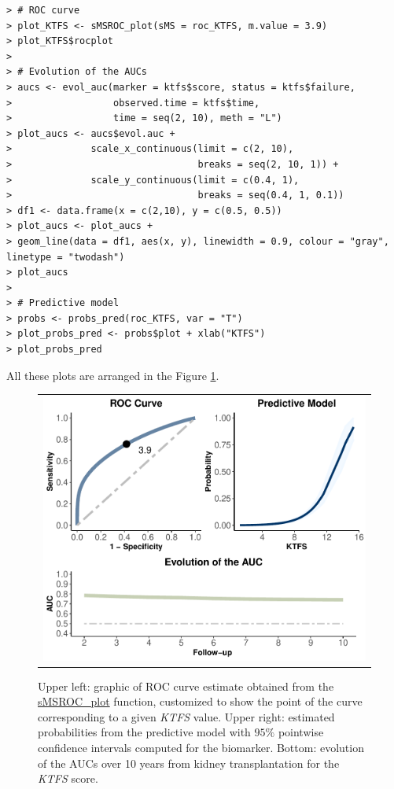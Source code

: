 \begin{verbatim}
> # ROC curve
> plot_KTFS <- sMSROC_plot(sMS = roc_KTFS, m.value = 3.9)
> plot_KTFS$rocplot
>
> # Evolution of the AUCs
> aucs <- evol_auc(marker = ktfs$score, status = ktfs$failure,
>                  observed.time = ktfs$time,
>                  time = seq(2, 10), meth = "L")
> plot_aucs <- aucs$evol.auc +
>              scale_x_continuous(limit = c(2, 10),
>                                 breaks = seq(2, 10, 1)) +
>              scale_y_continuous(limit = c(0.4, 1),
>                                 breaks = seq(0.4, 1, 0.1))
> df1 <- data.frame(x = c(2,10), y = c(0.5, 0.5))
> plot_aucs <- plot_aucs +
> geom_line(data = df1, aes(x, y), linewidth = 0.9, colour = "gray", linetype = "twodash")
> plot_aucs
>
> # Predictive model
> probs <- probs_pred(roc_KTFS, var = "T")
> plot_probs_pred <- probs$plot + xlab("KTFS")
> plot_probs_pred
\end{verbatim}

All these plots are arranged in the Figure \ref{FE2}.\par
\vspace{0.5cm}\noindent
\begin{figure}[h]
\begin{center}
\begin{tabular}{c}
\includegraphics[width=12.0cm]{figures/FE2.pdf} 
\end{tabular}
\caption{{\footnotesize{Upper left: graphic of ROC curve estimate obtained from the \url{sMSROC_plot} function, customized to show the point of the curve corresponding to a given {\it{KTFS}} value. Upper right: estimated probabilities from the predictive model with $95\%$ pointwise confidence intervals computed for the biomarker. Bottom: evolution of the  AUCs over 10 years from kidney transplantation for the {\it{KTFS}} score.} \label{FE2}}}
\end{center}
\end{figure} 

